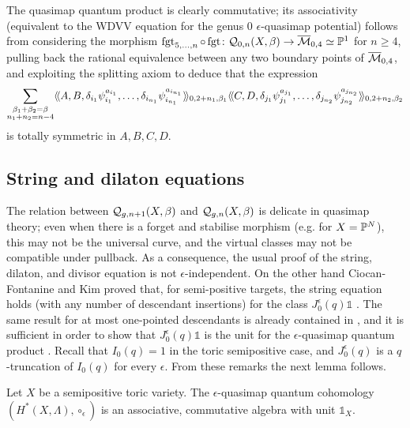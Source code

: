 \begin{rmk}
 The quasimap quantum product is clearly commutative; its associativity (equivalent to the WDVV equation for the genus $0$ $\epsilon$-quasimap potential) follows from considering the morphism $\operatorname{fgt}_{5,\ldots,n}\circ\operatorname{fgt}\colon \mathcal{Q}_{0,n}(X,\beta)\rightarrow\overline{\mathcal{M}}_{0,4}\simeq\mathbb P^1$ for $n\geq 4$, pulling back the rational equivalence between any two boundary points of $\overline{\mathcal{M}}_{0,4}$, and exploiting the splitting axiom to deduce that the expression
 \[\sum_{\substack{\beta_1+\beta_2=\beta \\ n_1+n_2=n-4}}\langle\!\langle A,B,\delta_{i_1}\psi_{i_1}^{a_{i_1}},\ldots,\delta_{i_{n_1}}\psi_{i_{n_1}}^{a_{i_{n_1}}}\rangle\!\rangle_{0,2+n_1,\beta_1}\langle\!\langle C,D,\delta_{j_1}\psi_{j_1}^{a_{j_1}},\ldots,\delta_{j_{n_2}}\psi_{j_{n_2}}^{a_{j_{n_2}}}\rangle\!\rangle_{0,2+n_2,\beta_2}\]
 is totally symmetric in $A,B,C,D$.
\end{rmk}
\subsection{String and dilaton equations}
 The relation between $\mathcal{Q}_{g,n+1}(X,\beta)$ and $\mathcal{Q}_{g,n}(X,\beta)$ is delicate in quasimap theory; even when there is a forget and stabilise morphism (e.g. for $X=\mathbb P^N$), this may not be the universal curve, and the virtual classes may not be compatible under pullback. As a consequence, the usual proof of the string, dilaton, and divisor equation is not $\epsilon$-independent. On the other hand Ciocan-Fontanine and Kim proved that, for semi-positive targets, the string equation holds (with any number of descendant insertions) for the class $J_0^\epsilon(q)\mathds{1}$ \cite[Proposition 3.4.1]{CF-K-higher-genus}. The same result for at most one-pointed descendants is already contained in \cite[Corollary 5.5.4]{CF-K-wallcrossing}, and it is sufficient in order to show that $J_0^\epsilon(q)\mathds{1}$ is the unit for the $\epsilon$-quasimap quantum product \cite[Remark 3.1.4]{CF-K-higher-genus}. Recall that $I_0(q)=1$ in the toric semipositive case, and $J_0^\epsilon(q)$ is a $q$-truncation of $I_0(q)$ for every $\epsilon$. From these remarks the next lemma follows.

 \begin{lemma}
 Let $X$ be a semipositive toric variety. The $\epsilon$-quasimap quantum cohomology $(H^*(X,\Lambda),\circ_\epsilon)$ is an associative, commutative algebra with unit $\mathds 1_X$.
 \end{lemma}
 
